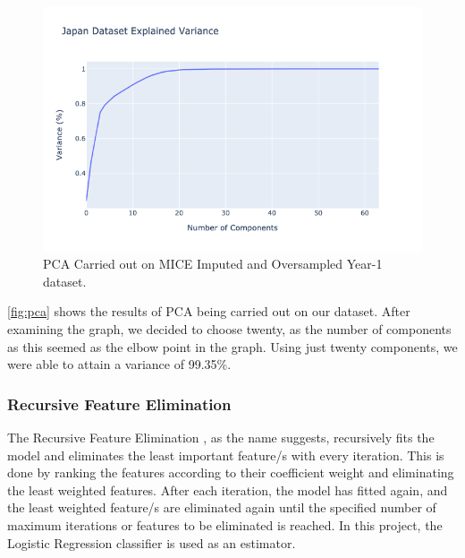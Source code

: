 \begin{figure}[htp]
\centering
\captionsetup{justification=centering}
  
  \centering
    \includegraphics[width=\textwidth]{Images/pca.png}
  \caption{PCA Carried out on MICE Imputed and Oversampled Year-1 dataset.}
  \label{fig:pca}
\end{figure}

\autoref{fig:pca} shows the results of PCA being carried out on our dataset. After examining the graph, we decided to choose twenty, as the number of components as this seemed as the elbow point in the graph. Using just twenty components, we were able to attain a variance of 99.35\%.  



\subsubsection{Recursive Feature Elimination}
\label{sec:RFE}
The Recursive Feature Elimination \cite{guyon2002gene}, as the name suggests, recursively fits the model and eliminates the least important feature/s with every iteration. This is done by ranking the features according to their coefficient weight and eliminating the least weighted features. After each iteration, the model has fitted again, and the least weighted feature/s are eliminated again until the specified number of maximum iterations or features to be eliminated is reached. In this project, the Logistic Regression classifier is used as an estimator.

